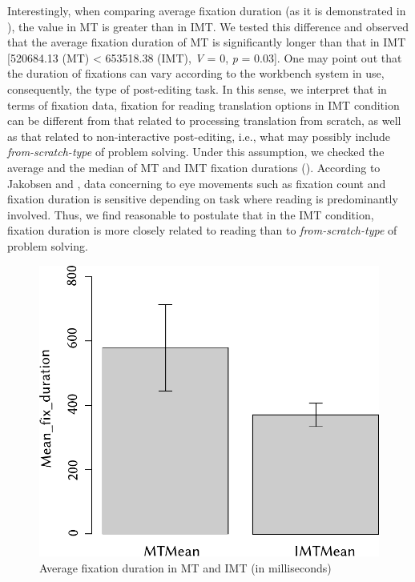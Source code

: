 \documentclass[output=paper]{langsci/langscibook}
\begin{document}
Interestingly, when comparing average fixation duration (as it is demonstrated in ), the value in MT is greater than in IMT. We tested this difference and observed that the average fixation duration of MT is significantly longer than that in IMT [520684.13 (MT) {\textless} 653518.38 (IMT), \textit{V} = 0, \textit{p} = 0.03]. One may point out that the duration of fixations can vary according to the workbench system in use, consequently, the type of post-editing task. In this sense, we interpret that in terms of fixation data, fixation for reading translation options in IMT condition can be different from that related to processing translation from scratch, as well as that related to non-interactive post-editing, i.e., what may possibly include \textit{from-scratch-type} of problem solving. Under this assumption, we checked the average and the median of MT and IMT fixation durations (). According to Jakobsen and \citet{jakobsen2008}, data concerning to eye movements such as fixation count and fixation duration is sensitive depending on task where reading is predominantly involved. Thus, we find reasonable to postulate that in the IMT condition, fixation duration is more closely related to reading than to \textit{from-scratch-type} of problem solving. 



\begin{figure}
 \includegraphics[width=.6\textwidth]{figures/Alves7_neu.pdf} 
 \caption{Average fixation duration in MT and IMT (in milliseconds)}
 \label{sarto:fig:7}
\end{figure} 
\end{document}
